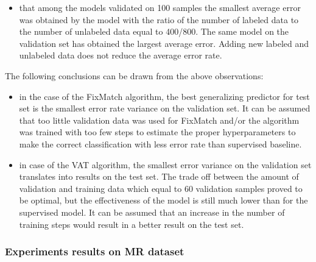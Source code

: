 \documentclass[12pt]{article}
\theoremstyle{definition}
\DeclareRobustCommand{\[}{\begin{equation}}
\DeclareRobustCommand{\]}{\end{equation}}
\begin{document}
\begin{itemize}
\begin{itemize}
        \item that among the models validated on 100 samples the smallest average error was obtained by the model with the ratio of the number of labeled data to the number of unlabeled data equal to 400/800. The same model on the validation set has obtained the largest average error. Adding new labeled and unlabeled data does not reduce the average error rate. 
    \end{itemize}
\end{itemize}
\vspace{5mm} %
The following conclusions can be drawn from the above observations:
    \begin{itemize}
        \item in the case of the FixMatch algorithm, the best generalizing predictor for test set is the smallest error rate variance on the validation set. It can be assumed that too little validation data was used for FixMatch and/or the algorithm was trained with too few steps to estimate the proper hyperparameters to make the correct classification with less error rate than supervised baseline.
        \item in case of the VAT algorithm, the smallest error variance on the validation set translates into results on the test set. The trade off between the amount of validation and training data which equal to 60 validation samples proved to be optimal, but the effectiveness of the model is still much lower than for the supervised model. It can be assumed that an increase in the number of training steps would result in a better result on the test set.
    \end{itemize}
\subsubsection{Experiments results on MR dataset}
\end{document}
